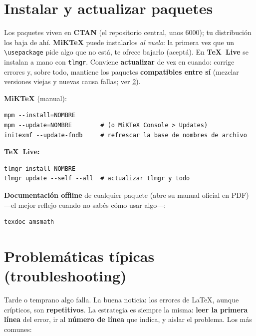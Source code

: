 \documentclass[11pt,a4paper]{article}
\newcommand{\C}[1]{\texttt{\textbackslash #1}}
\begin{document}
\section{Instalar y actualizar paquetes}
Los paquetes viven en \textbf{CTAN} (el repositorio central, unos 6000); tu
distribución los baja de ahí. \textbf{MiKTeX} puede instalarlos \emph{al vuelo}:
la primera vez que un \C{usepackage} pide algo que no está, te ofrece bajarlo
(aceptá). En \textbf{TeX~Live} se instalan a mano con \texttt{tlmgr}. Conviene
\textbf{actualizar} de vez en cuando: corrige errores y, sobre todo, mantiene los
paquetes \textbf{compatibles entre sí} (mezclar versiones viejas y nuevas causa
fallas; ver \cref{sec:trouble}).

\textbf{MiKTeX} (manual):
\begin{lstlisting}
mpm --install=NOMBRE
mpm --update=NOMBRE        # (o MiKTeX Console > Updates)
initexmf --update-fndb     # refrescar la base de nombres de archivo
\end{lstlisting}
\textbf{TeX~Live:}
\begin{lstlisting}
tlmgr install NOMBRE
tlmgr update --self --all  # actualizar tlmgr y todo
\end{lstlisting}
\textbf{Documentación offline} de cualquier paquete (abre su manual oficial en
PDF) —el mejor reflejo cuando no sabés cómo usar algo—:
\begin{lstlisting}
texdoc amsmath
\end{lstlisting}

\section{Problemáticas típicas (troubleshooting)}\label{sec:trouble}
Tarde o temprano algo falla. La buena noticia: los errores de \LaTeX, aunque
crípticos, son \textbf{repetitivos}. La estrategia es siempre la misma:
\textbf{leer la primera línea} del error, ir al \textbf{número de línea} que
indica, y aislar el problema. Los más comunes:
\end{document}
